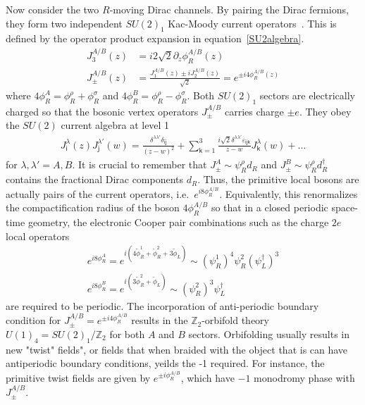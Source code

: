 Now consider the two $R$-moving Dirac channels. By pairing the Dirac fermions, they form two independent $SU(2)_1$ Kac-Moody current operators~\cite{bigyellowbook}. This is defined by the operator product expansion in equation~\ref{SU2algebra}. \begin{align}J_3^{A/B}(z)&=i2\sqrt{2}\partial_z\phi^{A/B}_R(z)\label{SU2current}\\J_\pm^{A/B}(z)&=\frac{J_1^{A/B}(z)\pm iJ_2^{A/B}(z)}{\sqrt{2}}=e^{\pm i4\phi^{A/B}_R(z)}\nonumber\end{align} where $4\phi^A_R=\phi^\rho_R+\phi^\sigma_R$ and $4\phi^B_R=\phi^\rho_R-\phi^\sigma_R$. Both $SU(2)_1$ sectors are electrically charged so that the bosonic vertex operators $J_\pm^{A/B}$ carries charge $\pm e$. They obey the $SU(2)$ current algebra at level 1 \begin{align}J^\lambda_{\mathsf{i}}(z)J^{\lambda'}_{\mathsf{j}}(w)=\frac{\delta^{\lambda\lambda'}\delta_{\mathsf{ij}}}{(z-w)^2}+\sum_{\mathsf{k}=1}^3\frac{i\sqrt{2}\delta^{\lambda\lambda'}\varepsilon_{\mathsf{ijk}}}{z-w}J^\lambda_{\mathsf{k}}(w)+\ldots\label{SU2algebra}\end{align} for $\lambda,\lambda'=A,B$. It is crucial to remember that $J_\pm^A\sim\psi^\rho_Rd_R$ and $J_\pm^B\sim\psi^\rho_Rd_R^\dagger$ contains the fractional Dirac components $d_R$. Thus, the primitive local bosons are actually pairs of the current operators, i.e.~$e^{i8\phi^{A/B}_R}$. Equivalently, this renormalizes the compactification radius of the boson $4\phi^{A/B}_R$ so that in a closed periodic space-time geometry, the electronic Cooper pair combinations such as the charge $2e$ local operators  \begin{gather}e^{i8\phi^A_R}=e^{i(4\tilde\phi^1_R+\tilde\phi^2_R+3\tilde\phi_L)}\sim(\psi^1_R)^4\psi^2_R(\psi_L^\dagger)^3\nonumber\\e^{i8\phi^B_R}=e^{i(3\tilde\phi^2_R+\tilde\phi_L)}\sim(\psi^2_R)^3\psi_L^\dagger\end{gather} are required to be periodic. The incorporation of anti-periodic boundary condition for $J_\pm^{A/B}=e^{\pm i4\phi^{A/B}_R}$ results in the $\mathbb{Z}_2$-orbifold theory~\cite{Ginsparg88,DijkgraafVafaVerlindeVerlinde99} $U(1)_4=SU(2)_1/\mathbb{Z}_2$ for both $A$ and $B$ sectors. Orbifolding usually results in new "twist" fields", or fields that when braided with the object that is can have antiperiodic boundary conditions, yeilds the -1 required. For instance, the primitive twist fields are given by $e^{\pm i\phi^{A/B}_R}$, which have $-1$ monodromy phase with $J_\pm^{A/B}$. 

